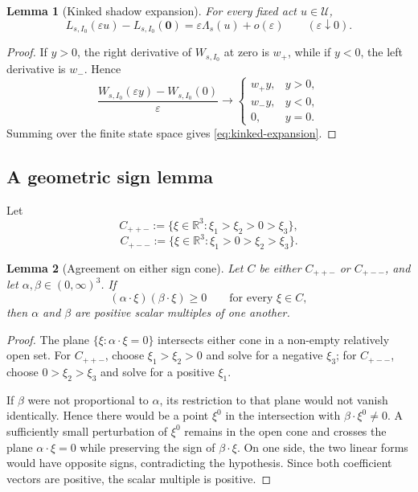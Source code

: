 \documentclass[11pt,a4paper]{article}
\newtheorem{lemma}[lemma]{Lemma}
\theoremstyle{definition}
\newcommand{\U}{\mathcal U}
\newcommand{\zero}{\mathbf 0}
\begin{document}
\begin{lemma}[Kinked shadow expansion]\label{lem:kinked-expansion}
For every fixed act $u\in\U$,
\begin{equation}\label{eq:kinked-expansion}
 L_{s,I_0}(\varepsilon u)-L_{s,I_0}(\zero)
 =\varepsilon\Lambda_s(u)+o(\varepsilon)
 \qquad(\varepsilon\downarrow0).
\end{equation}
\end{lemma}
\begin{proof}
If $y>0$, the right derivative of $W_{s,I_0}$ at zero is $w_+$, while if
$y<0$, the left derivative is $w_-$. Hence
\[
 \frac{W_{s,I_0}(\varepsilon y)-W_{s,I_0}(0)}{\varepsilon}
 \longrightarrow
 \begin{cases}
  w_+y,&y>0,\\
  w_-y,&y<0,\\
  0,&y=0.
 \end{cases}
\]
Summing over the finite state space gives \eqref{eq:kinked-expansion}.
\end{proof}

\subsection{A geometric sign lemma}

Let
\[
 C_{++-}:=\{\xi\in\mathbb R^3:\xi_1>\xi_2>0>\xi_3\},
\]
\[
 C_{+--}:=\{\xi\in\mathbb R^3:\xi_1>0>\xi_2>\xi_3\}.
\]

\begin{lemma}[Agreement on either sign cone]\label{lem:sign-cone}
Let $C$ be either $C_{++-}$ or $C_{+--}$, and let
$\alpha,\beta\in(0,\infty)^3$. If
\[
 (\alpha\cdot\xi)(\beta\cdot\xi)\geq0
 \qquad\text{for every }\xi\in C,
\]
then $\alpha$ and $\beta$ are positive scalar multiples of one another.
\end{lemma}

\begin{proof}
The plane $\{\xi:\alpha\cdot\xi=0\}$ intersects either cone in a non-empty
relatively open set. For $C_{++-}$, choose $\xi_1>\xi_2>0$ and solve for a
negative $\xi_3$; for $C_{+--}$, choose $0>\xi_2>\xi_3$ and solve for a
positive $\xi_1$.

If $\beta$ were not proportional to $\alpha$, its restriction to that plane
would not vanish identically. Hence there would be a point $\xi^0$ in the
intersection with $\beta\cdot\xi^0\neq0$. A sufficiently small perturbation
of $\xi^0$ remains in the open cone and crosses the plane
$\alpha\cdot\xi=0$ while preserving the sign of $\beta\cdot\xi$. On one side,
the two linear forms would have opposite signs, contradicting the hypothesis.
Since both coefficient vectors are positive, the scalar multiple is positive.
\end{proof}
\end{document}
